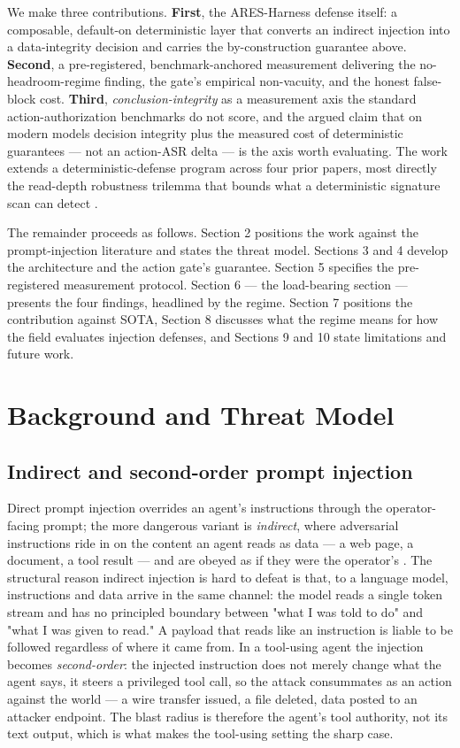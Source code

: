 \documentclass[sigconf,anonymous,review]{acmart}
\begin{document}
We make three contributions. \textbf{First}, the ARES-Harness defense itself: a composable, default-on deterministic layer that converts an indirect injection into a data-integrity decision and carries the by-construction guarantee above. \textbf{Second}, a pre-registered, benchmark-anchored measurement delivering the no-headroom-regime finding, the gate's empirical non-vacuity, and the honest false-block cost. \textbf{Third}, \textit{conclusion-integrity} as a measurement axis the standard action-authorization benchmarks do not score, and the argued claim that on modern models decision integrity plus the measured cost of deterministic guarantees --- not an action-ASR delta --- is the axis worth evaluating. The work extends a deterministic-defense program across four prior papers, most directly the read-depth robustness trilemma that bounds what a deterministic signature scan can detect \citep{gmys-casiano-2026a, gmys-casiano-2026d}.

The remainder proceeds as follows. Section 2 positions the work against the prompt-injection literature and states the threat model. Sections 3 and 4 develop the architecture and the action gate's guarantee. Section 5 specifies the pre-registered measurement protocol. Section 6 --- the load-bearing section --- presents the four findings, headlined by the regime. Section 7 positions the contribution against SOTA, Section 8 discusses what the regime means for how the field evaluates injection defenses, and Sections 9 and 10 state limitations and future work.


\section{Background and Threat Model}

\subsection{Indirect and second-order prompt injection}
Direct prompt injection overrides an agent's instructions through the operator-facing prompt; the more dangerous variant is \textit{indirect}, where adversarial instructions ride in on the content an agent reads as data --- a web page, a document, a tool result --- and are obeyed as if they were the operator's \citep{greshake-2023}. The structural reason indirect injection is hard to defeat is that, to a language model, instructions and data arrive in the same channel: the model reads a single token stream and has no principled boundary between "what I was told to do" and "what I was given to read." A payload that reads like an instruction is liable to be followed regardless of where it came from. In a tool-using agent the injection becomes \textit{second-order}: the injected instruction does not merely change what the agent says, it steers a privileged tool call, so the attack consummates as an action against the world --- a wire transfer issued, a file deleted, data posted to an attacker endpoint. The blast radius is therefore the agent's tool authority, not its text output, which is what makes the tool-using setting the sharp case.
\end{document}
